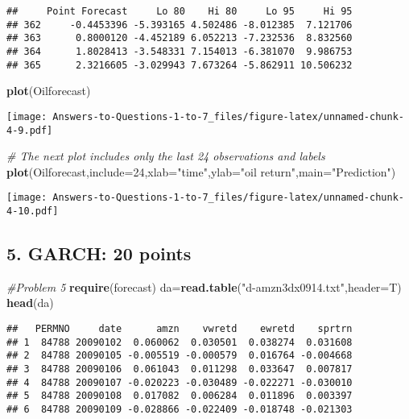 \documentclass[
]{article}
\newenvironment{Shaded}{\begin{snugshade}}{\end{snugshade}}
\newcommand{\AttributeTok}[1]{\textcolor[rgb]{0.13,0.29,0.53}{#1}}
\newcommand{\CommentTok}[1]{\textcolor[rgb]{0.56,0.35,0.01}{\textit{#1}}}
\newcommand{\DecValTok}[1]{\textcolor[rgb]{0.00,0.00,0.81}{#1}}
\newcommand{\FunctionTok}[1]{\textcolor[rgb]{0.13,0.29,0.53}{\textbf{#1}}}
\newcommand{\NormalTok}[1]{#1}
\newcommand{\OtherTok}[1]{\textcolor[rgb]{0.56,0.35,0.01}{#1}}
\newcommand{\StringTok}[1]{\textcolor[rgb]{0.31,0.60,0.02}{#1}}
\begin{document}
\begin{verbatim}
##     Point Forecast     Lo 80    Hi 80     Lo 95     Hi 95
## 362     -0.4453396 -5.393165 4.502486 -8.012385  7.121706
## 363      0.8000120 -4.452189 6.052213 -7.232536  8.832560
## 364      1.8028413 -3.548331 7.154013 -6.381070  9.986753
## 365      2.3216605 -3.029943 7.673264 -5.862911 10.506232
\end{verbatim}

\begin{Shaded}
\begin{Highlighting}[]
\FunctionTok{plot}\NormalTok{(Oilforecast)}
\end{Highlighting}
\end{Shaded}

\texttt{[image: Answers-to-Questions-1-to-7\_files/figure-latex/unnamed-chunk-4-9.pdf]}

\begin{Shaded}
\begin{Highlighting}[]
\CommentTok{\# The next plot includes only the last 24 observations and labels}
\FunctionTok{plot}\NormalTok{(Oilforecast,}\AttributeTok{include=}\DecValTok{24}\NormalTok{,}\AttributeTok{xlab=}\StringTok{"time"}\NormalTok{,}\AttributeTok{ylab=}\StringTok{"oil return"}\NormalTok{,}\AttributeTok{main=}\StringTok{"Prediction"}\NormalTok{)}
\end{Highlighting}
\end{Shaded}

\texttt{[image: Answers-to-Questions-1-to-7\_files/figure-latex/unnamed-chunk-4-10.pdf]}

\subsection{5. GARCH: 20 points}\label{garch-20-points}

\begin{Shaded}
\begin{Highlighting}[]
\CommentTok{\#Problem 5}
\FunctionTok{require}\NormalTok{(forecast)}
\NormalTok{da}\OtherTok{=}\FunctionTok{read.table}\NormalTok{(}\StringTok{"d{-}amzn3dx0914.txt"}\NormalTok{,}\AttributeTok{header=}\NormalTok{T)}
\FunctionTok{head}\NormalTok{(da)}
\end{Highlighting}
\end{Shaded}

\begin{verbatim}
##   PERMNO     date      amzn    vwretd    ewretd    sprtrn
## 1  84788 20090102  0.060062  0.030501  0.038274  0.031608
## 2  84788 20090105 -0.005519 -0.000579  0.016764 -0.004668
## 3  84788 20090106  0.061043  0.011298  0.033647  0.007817
## 4  84788 20090107 -0.020223 -0.030489 -0.022271 -0.030010
## 5  84788 20090108  0.017082  0.006284  0.011896  0.003397
## 6  84788 20090109 -0.028866 -0.022409 -0.018748 -0.021303
\end{verbatim}
\end{document}
